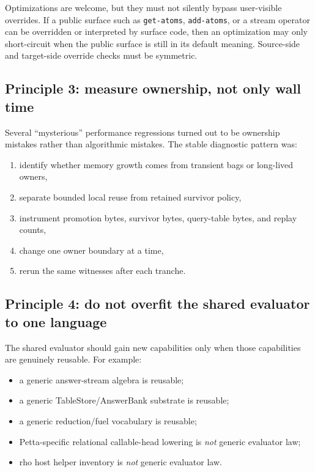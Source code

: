\documentclass[11pt]{article}
\begin{document}
Optimizations are welcome, but they must not silently bypass user-visible overrides. If a public surface such as \texttt{get-atoms}, \texttt{add-atoms}, or a stream operator can be overridden or interpreted by surface code, then an optimization may only short-circuit when the public surface is still in its default meaning. Source-side and target-side override checks must be symmetric.

\subsection{Principle 3: measure ownership, not only wall time}

Several ``mysterious'' performance regressions turned out to be ownership mistakes rather than algorithmic mistakes. The stable diagnostic pattern was:
\begin{enumerate}
    \item identify whether memory growth comes from transient bags or long-lived owners,
    \item separate bounded local reuse from retained survivor policy,
    \item instrument promotion bytes, survivor bytes, query-table bytes, and replay counts,
    \item change one owner boundary at a time,
    \item rerun the same witnesses after each tranche.
\end{enumerate}

\subsection{Principle 4: do not overfit the shared evaluator to one language}

The shared evaluator should gain new capabilities only when those capabilities are genuinely reusable. For example:
\begin{itemize}
    \item a generic answer-stream algebra is reusable;
    \item a generic TableStore/AnswerBank substrate is reusable;
    \item a generic reduction/fuel vocabulary is reusable;
    \item Petta-specific relational callable-head lowering is \emph{not} generic evaluator law;
    \item rho host helper inventory is \emph{not} generic evaluator law.
\end{itemize}
\end{document}
